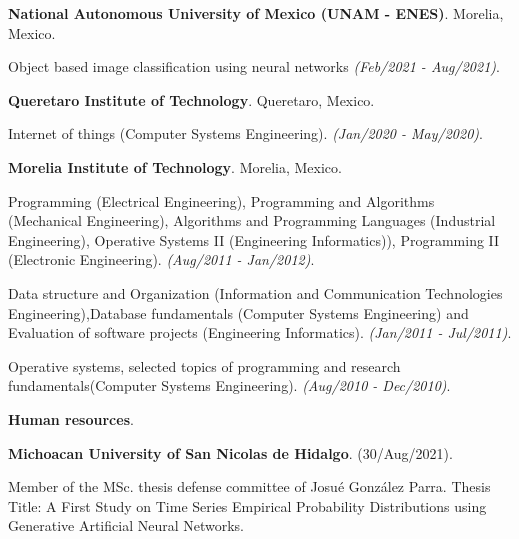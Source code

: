 \documentclass[7pt]{article}
\newenvironment{innerlist}[1][\enskip\textbullet]%
        {\begin{compactitem}[#1]}{\end{compactitem}}
\newcommand{\blankline}{\quad\pagebreak[2]}
\begin{document}
\blankline

\textbf{National Autonomous University of Mexico (UNAM - ENES)}. Morelia, Mexico.

\begin{innerlist}
\item Object based image classification using neural networks \textit{(Feb/2021 - Aug/2021)}.
\end{innerlist}

\blankline

\textbf{Queretaro Institute of Technology}. Queretaro, Mexico.

\begin{innerlist}
\item Internet of things (Computer Systems Engineering). \textit{(Jan/2020 - May/2020)}.
\end{innerlist}

\blankline

\textbf{Morelia Institute of Technology}. Morelia, Mexico.

\begin{innerlist}
\item Programming (Electrical Engineering), Programming and Algorithms (Mechanical Engineering), Algorithms and Programming Languages (Industrial Engineering), Operative Systems II (Engineering Informatics)), Programming II (Electronic Engineering). \textit{(Aug/2011  - Jan/2012)}.
\item Data structure and Organization (Information and Communication Technologies Engineering),Database fundamentals (Computer Systems Engineering) and Evaluation of software projects (Engineering Informatics). \textit{(Jan/2011 - Jul/2011)}.
\item Operative systems, selected topics of programming and research fundamentals(Computer Systems Engineering). \textit{(Aug/2010 - Dec/2010)}.
\end{innerlist}


\blankline

\textbf{Human resources}.

\blankline

\textbf{Michoacan University of San Nicolas de Hidalgo}. (30/Aug/2021).

\blankline

\begin{innerlist}
\item  Member of the MSc. thesis defense committee of Josué González Parra.  
Thesis Title: A First Study on Time Series Empirical Probability Distributions using Generative Artificial Neural Networks. 
\end{innerlist}
\end{document}
